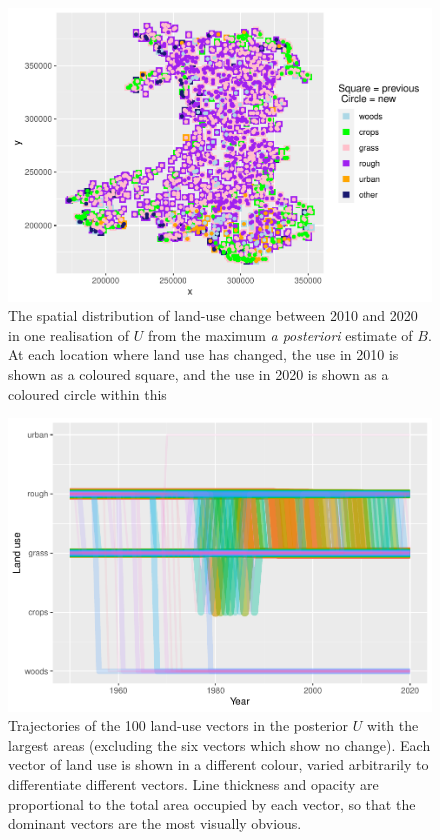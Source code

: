\documentclass[
]{book}
\begin{document}
\begin{figure}
\centering
\includegraphics{Results_wa_files/figure-latex/plotUd-1.pdf}
\caption{\label{fig:plotUd}The spatial distribution of land-use change between 2010 and 2020 in one realisation of \(U\) from the maximum \emph{a posteriori} estimate of \(B\). At each location where land use has changed, the use in 2010 is shown as a coloured square, and the use in 2020 is shown as a coloured circle within this}
\end{figure}

\begin{figure}
\centering
\includegraphics{Results_wa_files/figure-latex/plotv1-1.pdf}
\caption{\label{fig:plotv1}Trajectories of the 100 land-use vectors in the posterior \(U\) with the largest areas (excluding the six vectors which show no change). Each vector of land use is shown in a different colour, varied arbitrarily to differentiate different vectors. Line thickness and opacity are proportional to the total area occupied by each vector, so that the dominant vectors are the most visually obvious.}
\end{figure}
\end{document}
